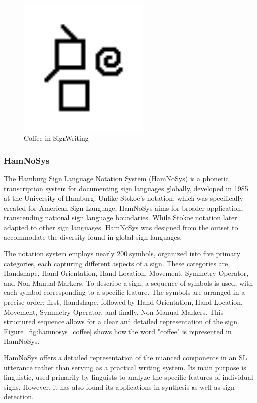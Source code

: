 \documentclass[../../main.tex]{subfiles}
\begin{document}
\begin{figure}
  \centering \includegraphics[width = 2.5in]{chapters/background_work/images/signwriting_coffee.png}
  \caption{Coffee in SignWriting}
  \label{fig:signwriting_coffee}
\end{figure}

\subsubsection{HamNoSys}
\label{ch:background_work:sign_language_descriptions:lexical_approaches:hamnosys}

The Hamburg Sign Language Notation System (HamNoSys) is a phonetic transcription system for documenting sign languages globally, developed in 1985 at the University of Hamburg. Unlike Stokoe's notation, which was specifically created for American Sign Language, HamNoSys aims for broader application, transcending national sign language boundaries. While Stokoe notation later adapted to other sign languages, HamNoSys was designed from the outset to accommodate the diversity found in global sign languages.

The notation system employs nearly 200 symbols, organized into five primary categories, each capturing different aspects of a sign. These categories are Handshape, Hand Orientation, Hand Location, Movement, Symmetry Operator, and Non-Manual Markers. To describe a sign, a sequence of symbols is used, with each symbol corresponding to a specific feature. The symbols are arranged in a precise order: first, Handshape, followed by Hand Orientation, Hand Location, Movement, Symmetry Operator, and finally, Non-Manual Markers. This structured sequence allows for a clear and detailed representation of the sign. Figure~\ref{fig:hamnosys_coffee} shows how the word "coffee" is represented in HamNoSys.

HamNoSys offers a detailed representation of the nuanced components in an SL utterance rather than serving as a practical writing system. Its main purpose is linguistic, used primarily by linguists to analyze the specific features of individual signs. However, it has also found its applications in synthesis\cite{elliott2010towards} as well as sign detection\cite{mocialov2022unsupervised}.
\end{document}
